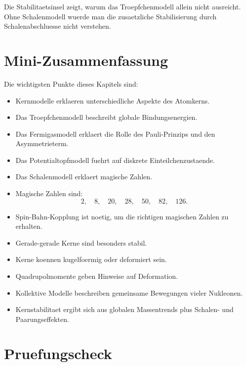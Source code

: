 \begin{notebox}
Die Stabilitaetsinsel zeigt, warum das Troepfchenmodell allein nicht ausreicht.
Ohne Schalenmodell wuerde man die zusaetzliche Stabilisierung durch Schalenabschluesse
nicht verstehen.
\end{notebox}

\section{Mini-Zusammenfassung}

\begin{notebox}
Die wichtigsten Punkte dieses Kapitels sind:
\begin{itemize}
    \item Kernmodelle erklaeren unterschiedliche Aspekte des Atomkerns.
    \item Das Troepfchenmodell beschreibt globale Bindungsenergien.
    \item Das Fermigasmodell erklaert die Rolle des Pauli-Prinzips und den Asymmetrieterm.
    \item Das Potentialtopfmodell fuehrt auf diskrete Einteilchenzustaende.
    \item Das Schalenmodell erklaert magische Zahlen.
    \item Magische Zahlen sind:
    \begin{equation*}
        2,\quad 8,\quad 20,\quad 28,\quad 50,\quad 82,\quad 126.
    \end{equation*}
    \item Spin-Bahn-Kopplung ist noetig, um die richtigen magischen Zahlen zu erhalten.
    \item Gerade-gerade Kerne sind besonders stabil.
    \item Kerne koennen kugelfoermig oder deformiert sein.
    \item Quadrupolmomente geben Hinweise auf Deformation.
    \item Kollektive Modelle beschreiben gemeinsame Bewegungen vieler Nukleonen.
    \item Kernstabilitaet ergibt sich aus globalen Massentrends plus Schalen- und Paarungseffekten.
\end{itemize}
\end{notebox}

\section{Pruefungscheck}

